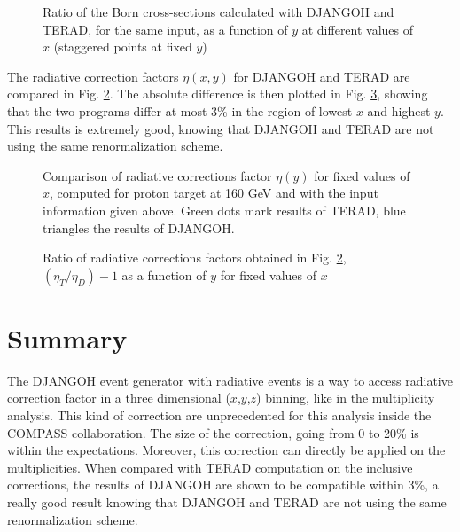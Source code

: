 \begin{figure}[htb]
\centerline{}
\caption{Ratio of the Born cross-sections calculated with DJANGOH and TERAD, for the same input, as a function of $y$
at different values of $x$ (staggered points at fixed $y$)}\label{fig:BRy}
\end{figure}

The radiative correction factors $\eta(x,y)$ for DJANGOH and TERAD are compared in Fig. \ref{fig:RCy}. The absolute difference is then plotted in Fig. \ref{fig:ERy}, showing that the two programs differ at most 3\% in the region of lowest $x$ and highest $y$. This results is extremely good, knowing that DJANGOH and TERAD are not using the same renormalization scheme.


\begin{figure}[htb]
\centerline{}
\caption{Comparison of radiative corrections factor $\eta(y)$ for fixed values of $x$, computed for proton target at 160 GeV
and with the input information given above. Green dots mark results of TERAD, blue triangles the results of DJANGOH.}\label{fig:RCy}
\end{figure}

\begin{figure}[htb]
\centerline{}
\caption{Ratio of radiative corrections factors obtained in Fig. \ref{fig:RCy}, $(\eta_T/\eta_D)-1$ as a function of $y$ for fixed values of $x$}\label{fig:ERy}
\end{figure}

\newpage


\section{Summary}

The DJANGOH event generator with radiative events is a way to access radiative correction factor in a three dimensional ($x$,$y$,$z$) binning, like in the multiplicity analysis. This kind of correction are unprecedented for this analysis inside the COMPASS collaboration. The size of the correction, going from 0 to 20\% is within the expectations. Moreover, this correction can directly be applied on the multiplicities. When compared with TERAD computation on the inclusive corrections, the results of DJANGOH are shown to be compatible within 3\%, a really good result knowing that DJANGOH and TERAD are not using the same renormalization scheme.
